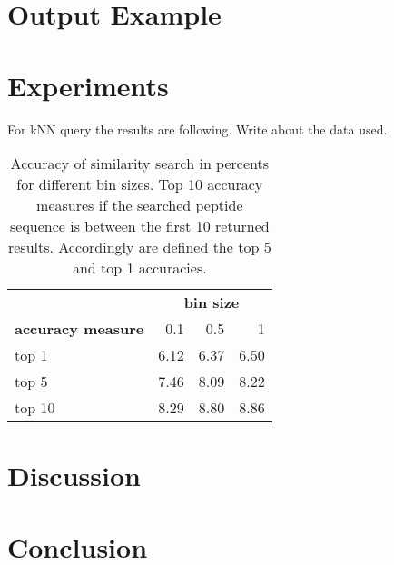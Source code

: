 \documentclass[a4paper,10pt,twocolumn]{article}
\begin{document}
\section{Output Example}

\section{Experiments}

For kNN query the results are following. Write about the data used.

\begin{table}[h]
    \begin{center}
        \label{table:TODO}
        \begin{tabular}{l|rrr}
            & \multicolumn{3}{c}{\textbf{bin size}} \\
            \textbf{accuracy measure} & 0.1 & 0.5 & 1 \\
            \hline
            top 1 & 6.12 & 6.37 & 6.50 \\
            top 5 & 7.46 & 8.09 & 8.22 \\
            top 10 & 8.29 & 8.80 & 8.86 \\
        \end{tabular}
        \caption{
            Accuracy of similarity search in percents for different bin sizes.
            Top 10 accuracy measures if the searched peptide sequence is between
            the first 10 returned results. Accordingly are defined the top 5
            and top 1 accuracies.
        }
    \end{center}
\end{table}

\section{Discussion}

\section{Conclusion}

{}

\end{document}
